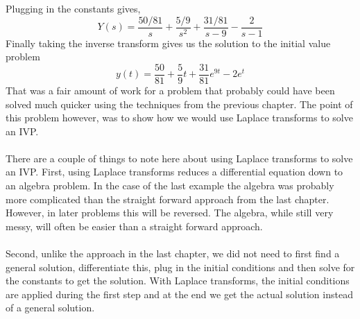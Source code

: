 \documentclass[10pt,reqno]{book}
\theoremstyle{definition}
\begin{document}
	Plugging in the constants gives,
	\[ Y(s) = \frac{50/81}{s} + \frac{5/9}{s^2} + \frac{31/81}{s - 9} - \frac{2}{s - 1} \]
	Finally taking the inverse transform gives us the solution to the initial value problem
	\[ y(t) = \frac{50}{81} + \frac{5}{9}t + \frac{31}{81}e^{9t} - 2e^t \]
	That was a fair amount of work for a problem that probably could have been solved much quicker using the techniques from the previous chapter. The point of this problem however, was to show how we would use Laplace transforms to solve an IVP.\\ \\
	There are a couple of things to note here about using Laplace transforms to solve an IVP.  First, using Laplace transforms reduces a differential equation down to an algebra problem.  In the case of the last example the algebra was probably more complicated than the straight forward approach from the last chapter.  However, in later problems this will be reversed.  The algebra, while still very messy, will often be easier than a straight forward approach.\\ \\
	Second, unlike the approach in the last chapter, we did not need to first find a general solution, differentiate this, plug in the initial conditions and then solve for the constants to get the solution.  With Laplace transforms, the initial conditions are applied during the first step and at the end we get the actual solution instead of a general solution.
	
	




	

	\pagestyle{plain}
\end{document}
